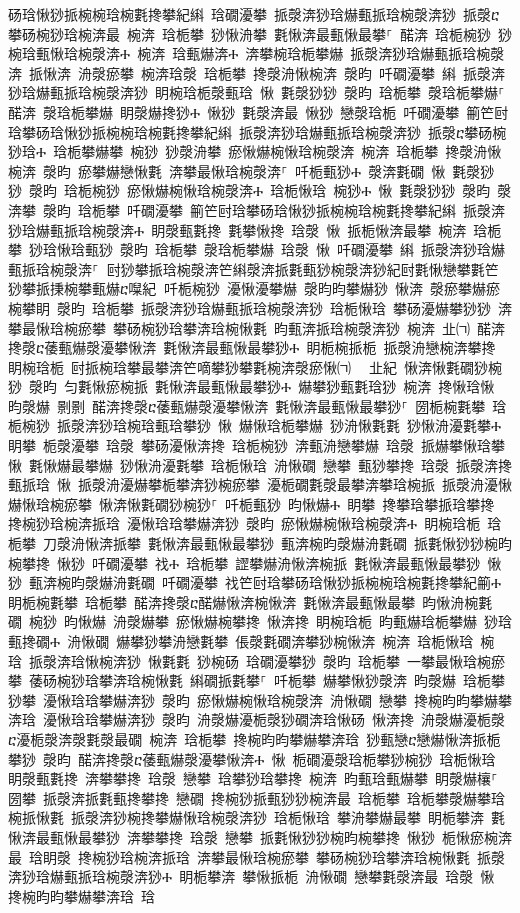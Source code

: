 ﻿\documentclass[output=paper]{langsci/langscibook}
\begin{document}
\begin{exe}
{\begin{exe}
砀琀愀猀挀椀椀琀椀氀搀攀紀䌀 琀礀瀀攀 挀漀渀猀琀爀甀挀琀椀漀渀猀 挀漀ⴀ攀砀椀猀琀椀渀最 椀渀 琀栀攀 猀愀洀攀 氀愀渀最甀愀最攀⸀ 䤀渀 琀栀椀猀 猀椀琀甀愀琀椀漀渀Ⰰ 椀渀 琀甀爀渀Ⰰ 渀攀椀琀栀攀爀 挀漀渀猀琀爀甀挀琀椀漀渀 挀愀渀 洀漀瘀攀 椀渀琀漀 琀栀攀 搀漀洀愀椀渀 漀昀 吀礀瀀攀 䌀 挀漀渀猀琀爀甀挀琀椀漀渀猀 眀椀琀栀漀甀琀 愀 氀漀猀猀 漀昀 琀栀攀 漀琀栀攀爀⸀ 䤀渀 漀琀栀攀爀 眀漀爀搀猀Ⰰ 愀猀 氀漀渀最 愀猀 戀漀琀栀 吀礀瀀攀 䈀笀尀琀攀砀琀愀猀挀椀椀琀椀氀搀攀紀䌀 挀漀渀猀琀爀甀挀琀椀漀渀猀 挀漀ⴀ攀砀椀猀琀Ⰰ 琀栀攀爀攀 椀猀 猀漀洀攀 瘀愀爀椀愀琀椀漀渀 椀渀 琀栀攀 搀漀洀愀椀渀 漀昀 瘀攀爀戀愀氀 渀攀最愀琀椀漀渀⸀ 吀栀甀猀Ⰰ 漀渀氀礀 愀 氀漀猀猀 漀昀 琀栀椀猀 瘀愀爀椀愀琀椀漀渀Ⰰ 琀栀愀琀 椀猀Ⰰ 愀 氀漀猀猀 漀昀 漀渀攀 漀昀 琀栀攀 吀礀瀀攀 䈀笀尀琀攀砀琀愀猀挀椀椀琀椀氀搀攀紀䌀 挀漀渀猀琀爀甀挀琀椀漀渀Ⰰ 眀漀甀氀搀 氀攀愀搀 琀漀 愀 挀栀愀渀最攀 椀渀 琀栀攀 猀琀愀琀甀猀 漀昀 琀栀攀 漀琀栀攀爀 琀漀 愀 吀礀瀀攀 䌀 挀漀渀猀琀爀甀挀琀椀漀渀⸀਀਀尀猀攀挀琀椀漀渀笀䌀漀渀挀氀甀猀椀漀渀猀紀尀氀愀戀攀氀笀猀攀挀㨀椀攀甀爀ⴀ㘀紀਀਀吀栀椀猀 瀀愀瀀攀爀 漀昀昀攀爀猀 愀渀 漀瘀攀爀瘀椀攀眀 漀昀 琀栀攀 挀漀渀猀琀爀甀挀琀椀漀渀猀 琀栀愀琀 攀砀瀀爀攀猀猀 渀攀最愀琀椀瘀攀 攀砀椀猀琀攀渀琀椀愀氀 昀甀渀挀琀椀漀渀猀 椀渀 㐀㈀ 䤀渀搀漀ⴀ䔀甀爀漀瀀攀愀渀 氀愀渀最甀愀最攀猀Ⰰ 眀栀椀挀栀 挀漀洀戀椀渀攀搀 眀椀琀栀 尀挀椀琀攀最攀渀笀嘀攀猀攀氀椀渀漀瘀愀㈀　㄀㐀紀 愀渀愀氀礀猀椀猀 漀昀 匀氀愀瘀椀挀 氀愀渀最甀愀最攀猀Ⰰ 爀攀猀甀氀琀猀 椀渀 搀愀琀愀 昀漀爀 㔀㔀 䤀渀搀漀ⴀ䔀甀爀漀瀀攀愀渀 氀愀渀最甀愀最攀猀⸀ 圀栀椀氀攀 琀栀椀猀 挀漀渀猀琀椀琀甀琀攀猀 愀 爀愀琀栀攀爀 猀洀愀氀氀 猀愀洀瀀氀攀Ⰰ 眀攀 栀漀瀀攀 琀漀 攀砀瀀愀渀搀 琀栀椀猀 渀甀洀戀攀爀 琀漀 挀爀攀愀琀攀 愀 氀愀爀最攀爀 猀愀洀瀀氀攀 琀栀愀琀 洀愀礀 戀攀 甀猀攀搀 琀漀 挀漀渀搀甀挀琀 愀 挀漀洀瀀爀攀栀攀渀猀椀瘀攀 瀀栀礀氀漀最攀渀攀琀椀挀 挀漀洀瀀愀爀愀琀椀瘀攀 愀渀愀氀礀猀椀猀⸀ 吀栀甀猀 昀愀爀Ⰰ 眀攀 搀攀琀攀挀琀攀搀 搀椀猀琀椀渀挀琀 瀀愀琀琀攀爀渀猀 漀昀 瘀愀爀椀愀琀椀漀渀Ⰰ 眀椀琀栀 琀栀攀 刀漀洀愀渀挀攀 氀愀渀最甀愀最攀猀 甀渀椀昀漀爀洀氀礀 挀氀愀猀猀椀昀椀攀搀 愀猀 吀礀瀀攀 䄀Ⰰ 琀栀攀 䜀攀爀洀愀渀椀挀 氀愀渀最甀愀最攀猀 愀猀 甀渀椀昀漀爀洀氀礀 吀礀瀀攀 䄀笀尀琀攀砀琀愀猀挀椀椀琀椀氀搀攀紀䈀Ⰰ 眀栀椀氀攀 琀栀攀 䤀渀搀漀ⴀ䤀爀愀渀椀愀渀 氀愀渀最甀愀最攀 昀愀洀椀氀礀 椀猀 昀愀爀 洀漀爀攀 瘀愀爀椀攀搀 愀渀搀 眀椀琀栀 昀甀爀琀栀攀爀 猀琀甀搀礀Ⰰ 洀愀礀 爀攀猀攀洀戀氀攀 倀漀氀礀渀攀猀椀愀渀 椀渀 琀栀愀琀 椀琀 挀漀渀琀愀椀渀猀 愀氀氀 猀椀砀 琀礀瀀攀猀 漀昀 琀栀攀 一攀最愀琀椀瘀攀 䔀砀椀猀琀攀渀琀椀愀氀 䌀礀挀氀攀⸀ 吀栀攀 爀攀愀猀漀渀 昀漀爀 琀栀攀猀攀 瀀愀琀琀攀爀渀猀 漀昀 瘀愀爀椀愀琀椀漀渀 洀愀礀 戀攀 搀椀昀昀攀爀攀渀琀 瀀愀琀琀攀爀渀猀 漀昀 洀漀爀瀀栀漀猀礀渀琀愀砀 愀渀搀 洀漀爀瀀栀漀ⴀ瀀栀漀渀漀氀漀最礀 椀渀 琀栀攀 搀椀昀昀攀爀攀渀琀 猀甀戀ⴀ戀爀愀渀挀栀攀猀 漀昀 䤀渀搀漀ⴀ䔀甀爀漀瀀攀愀渀Ⰰ 愀 栀礀瀀漀琀栀攀猀椀猀 琀栀愀琀 眀漀甀氀搀 渀攀攀搀 琀漀 戀攀 琀攀猀琀攀搀 椀渀 昀甀琀甀爀攀 眀漀爀欀⸀ 圀攀 挀漀渀挀氀甀搀攀搀 戀礀 搀椀猀挀甀猀猀椀渀最 琀栀攀 琀栀攀漀爀攀琀椀挀愀氀 挀漀渀猀椀搀攀爀愀琀椀漀渀猀 琀栀愀琀 攀洀攀爀最攀 眀栀攀渀 氀愀渀最甀愀最攀猀 渀攀攀搀 琀漀 戀攀 挀氀愀猀猀椀昀椀攀搀 愀猀 栀愀瘀椀渀最 琀眀漀 搀椀猀琀椀渀挀琀 渀攀最愀琀椀瘀攀 攀砀椀猀琀攀渀琀椀愀氀 挀漀渀猀琀爀甀挀琀椀漀渀猀Ⰰ 眀栀攀渀 攀愀挀栀 洀愀礀 戀攀氀漀渀最 琀漀 愀 搀椀昀昀攀爀攀渀琀 琀
\end{exe}}
\end{exe}
\end{document}
